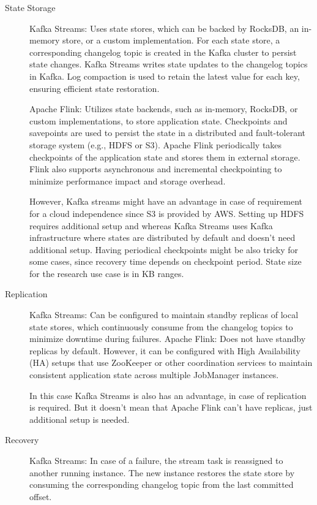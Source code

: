 \begin{description}
    \item[State Storage]
    Kafka Streams: Uses state stores, which can be backed by RocksDB,
    an in-memory store, or a custom implementation.
    For each state store, a corresponding changelog topic is created
    in the Kafka cluster to persist state changes.
    Kafka Streams writes state updates to the changelog topics in Kafka.
    Log compaction is used to retain the latest value for each key,
    ensuring efficient state restoration.

    Apache Flink: Utilizes state backends, such as in-memory,
    RocksDB, or custom implementations, to store application state.
    Checkpoints and savepoints are used to persist the state
    in a distributed and fault-tolerant storage system (e.g., HDFS or S3).
    Apache Flink periodically takes checkpoints of the application state
    and stores them in external storage.
    Flink also supports asynchronous and incremental checkpointing to
    minimize performance impact and storage overhead.

    However, Kafka streams might have an advantage in case of requirement for
    a cloud independence since S3 is provided by AWS.
    Setting up HDFS requires additional setup and whereas Kafka Streams
    uses Kafka infrastructure where states are distributed by default and
    doesn't need additional setup.
    Having periodical checkpoints might be also tricky for some cases, since recovery time
    depends on checkpoint period.
    State size for the research use case is in KB ranges.
    \newpage
    \item[Replication]
    Kafka Streams: Can be configured to maintain standby replicas of local state stores,
    which continuously consume from the changelog topics to minimize downtime during failures.
    Apache Flink: Does not have standby replicas by default.
    However, it can be configured with High Availability (HA) setups that use ZooKeeper
    or other coordination services to maintain consistent application state
    across multiple JobManager instances.

    In this case Kafka Streams is also has an advantage, in case of replication is required.
    But it doesn't mean that Apache Flink can't have replicas, just additional setup is needed.
    \item[Recovery]
    Kafka Streams: In case of a failure, the stream task is reassigned to another running instance.
    The new instance restores the state store by consuming the corresponding changelog topic
    from the last committed offset.


\end{description}
